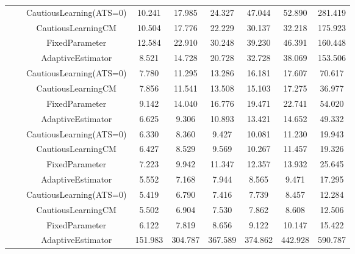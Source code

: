 \begin{table}[!h]
\begin{tabular}[t]{ccccccccc}
 &  & CautiousLearning(ATS=0) & 10.241 & 17.985 & 24.327 & 47.044 & 52.890 & 281.419\\

 &  & CautiousLearningCM & 10.504 & 17.776 & 22.229 & 30.137 & 32.218 & 175.923\\

 & \multirow[t]{-4}{*}{\centering\arraybackslash 0.75} & FixedParameter & 12.584 & 22.910 & 30.248 & 39.230 & 46.391 & 160.448\\
\cmidrule{2-9}
 &  & AdaptiveEstimator & 8.521 & 14.728 & 20.728 & 32.728 & 38.069 & 153.506\\

 &  & CautiousLearning(ATS=0) & 7.780 & 11.295 & 13.286 & 16.181 & 17.607 & 70.617\\

 &  & CautiousLearningCM & 7.856 & 11.541 & 13.508 & 15.103 & 17.275 & 36.977\\

 & \multirow[t]{-4}{*}{\centering\arraybackslash 1.00} & FixedParameter & 9.142 & 14.040 & 16.776 & 19.471 & 22.741 & 54.020\\
\cmidrule{2-9}
 &  & AdaptiveEstimator & 6.625 & 9.306 & 10.893 & 13.421 & 14.652 & 49.332\\

 &  & CautiousLearning(ATS=0) & 6.330 & 8.360 & 9.427 & 10.081 & 11.230 & 19.943\\

 &  & CautiousLearningCM & 6.427 & 8.529 & 9.569 & 10.267 & 11.457 & 19.326\\

 & \multirow[t]{-4}{*}{\centering\arraybackslash 1.25} & FixedParameter & 7.223 & 9.942 & 11.347 & 12.357 & 13.932 & 25.645\\
\cmidrule{2-9}
 &  & AdaptiveEstimator & 5.552 & 7.168 & 7.944 & 8.565 & 9.471 & 17.295\\

 &  & CautiousLearning(ATS=0) & 5.419 & 6.790 & 7.416 & 7.739 & 8.457 & 12.284\\

 &  & CautiousLearningCM & 5.502 & 6.904 & 7.530 & 7.862 & 8.608 & 12.506\\

\multirow[t]{-28}{*}{\centering\arraybackslash 1} & \multirow[t]{-4}{*}{\centering\arraybackslash 1.50} & FixedParameter & 6.122 & 7.819 & 8.656 & 9.122 & 10.147 & 15.422\\
\cmidrule{1-9}
 &  & AdaptiveEstimator & 151.983 & 304.787 & 367.589 & 374.862 & 442.928 & 590.787\\


\end{tabular}
\end{table}
